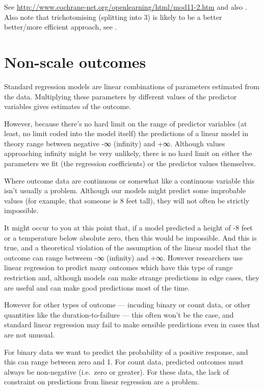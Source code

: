 \documentclass[]{article}
\begin{document}
See \url{http://www.cochrane-net.org/openlearning/html/mod11-2.htm} and also
\citet{peacock_dichotomising_2012}. Also note that trichotomising (splitting into 3) is
likely to be a better better/more efficient approach, see \citet{gelman2009splitting}.

\hypertarget{non-scale-outcomes}{%
\section{Non-scale outcomes}\label{non-scale-outcomes}}

Standard regression models are linear combinations of parameters estimated from
the data. Multiplying these parameters by different values of the predictor
variables gives estimates of the outcome.

However, because there's no hard limit on the range of predictor variables (at
least, no limit coded into the model itself) the predictions of a linear model
in theory range between negative -∞ (infinity) and +∞. Although values
approaching infinity might be very unlikely, there is no hard limit on either
the parameters we fit (the regression coefficients) or the predictor values
themselves.

Where outcome data are continuous or somewhat like a continuous variable this
isn't usually a problem. Although our models might predict some improbable
values (for example, that someone is 8 feet tall), they will not often be
strictly impossible.

It might occur to you at this point that, if a model predicted a height of -8
feet or a temperature below absolute zero, then this would be impossible. And
this is true, and a theoretical violation of the assumption of the linear model
that the outcome can range betweem -∞ (infinity) and +∞. However researchers use
linear regression to predict many outcomes which have this type of range
restriction and, although models can make strange predictions in edge cases,
they are useful and can make good predictions most of the time.

However for other types of outcome --- incuding binary or count data, or other
quantities like the duration-to-failure --- this often won't be the case, and
standard linear regression may fail to make sensible predictions even in cases
that are not unusual.

For binary data we want to predict the probability of a positive response, and
this can range between zero and 1. For count data, predicted outcomes must
always be non-negative (i.e.~zero or greater). For these data, the lack of
constraint on predictions from linear regression are a problem.
\end{document}
